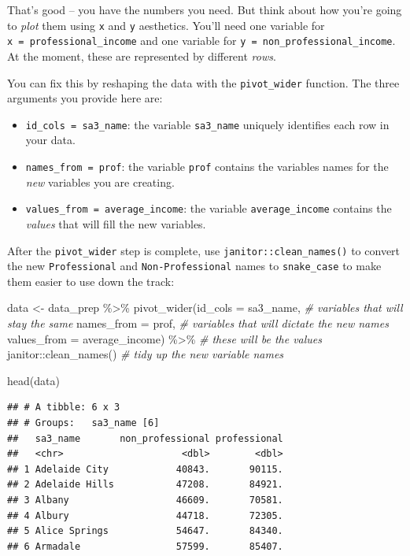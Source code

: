 \documentclass[
]{book}
\newenvironment{Shaded}{\begin{snugshade}}{\end{snugshade}}
\newcommand{\AttributeTok}[1]{\textcolor[rgb]{0.77,0.63,0.00}{#1}}
\newcommand{\CommentTok}[1]{\textcolor[rgb]{0.56,0.35,0.01}{\textit{#1}}}
\newcommand{\FunctionTok}[1]{\textcolor[rgb]{0.00,0.00,0.00}{#1}}
\newcommand{\NormalTok}[1]{#1}
\newcommand{\OtherTok}[1]{\textcolor[rgb]{0.56,0.35,0.01}{#1}}
\newcommand{\SpecialCharTok}[1]{\textcolor[rgb]{0.00,0.00,0.00}{#1}}
\providecommand{\tightlist}{%
  \setlength{\itemsep}{0pt}\setlength{\parskip}{0pt}}
\begin{document}
That's good -- you have the numbers you need. But think about how you're going to \emph{plot} them using \texttt{x} and \texttt{y} aesthetics. You'll need one variable for \texttt{x\ =\ professional\_income} and one variable for \texttt{y\ =\ non\_professional\_income}. At the moment, these are represented by different \emph{rows}.

You can fix this by reshaping the data with the \texttt{pivot\_wider} function. The three arguments you provide here are:

\begin{itemize}
\tightlist
\item
  \texttt{id\_cols\ =\ sa3\_name}: the variable \texttt{sa3\_name} uniquely identifies each row in your data.
\item
  \texttt{names\_from\ =\ prof}: the variable \texttt{prof} contains the variables names for the \emph{new} variables you are creating.
\item
  \texttt{values\_from\ =\ average\_income}: the variable \texttt{average\_income} contains the \emph{values} that will fill the new variables.
\end{itemize}

After the \texttt{pivot\_wider} step is complete, use \texttt{janitor::clean\_names()} to convert the new \texttt{Professional} and \texttt{Non-Professional} names to \texttt{snake\_case} to make them easier to use down the track:

\begin{Shaded}
\begin{Highlighting}[]
\NormalTok{data }\OtherTok{\textless{}{-}}\NormalTok{ data\_prep }\SpecialCharTok{\%\textgreater{}\%} 
  \FunctionTok{pivot\_wider}\NormalTok{(}\AttributeTok{id\_cols =}\NormalTok{ sa3\_name,  }\CommentTok{\# variables that will stay the same}
              \AttributeTok{names\_from =}\NormalTok{ prof,   }\CommentTok{\# variables that will dictate the new names}
              \AttributeTok{values\_from =}\NormalTok{ average\_income) }\SpecialCharTok{\%\textgreater{}\%}  \CommentTok{\# these will be the values}
\NormalTok{  janitor}\SpecialCharTok{::}\FunctionTok{clean\_names}\NormalTok{() }\CommentTok{\# tidy up the new variable names}

\FunctionTok{head}\NormalTok{(data)}
\end{Highlighting}
\end{Shaded}

\begin{verbatim}
## # A tibble: 6 x 3
## # Groups:   sa3_name [6]
##   sa3_name       non_professional professional
##   <chr>                     <dbl>        <dbl>
## 1 Adelaide City            40843.       90115.
## 2 Adelaide Hills           47208.       84921.
## 3 Albany                   46609.       70581.
## 4 Albury                   44718.       72305.
## 5 Alice Springs            54647.       84340.
## 6 Armadale                 57599.       85407.
\end{verbatim}
\end{document}
